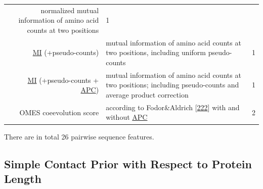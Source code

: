 \documentclass[11pt,a4paper,twoside]{book}
\theoremstyle{definition}
\theoremstyle{definition}
\theoremstyle{remark}
\begin{document}
\begin{longtable}[]{@{}rlc@{}}
\begin{minipage}[t]{0.50\columnwidth}
normalized mutual information of amino acid counts at two
positions\strut
\end{minipage} & \begin{minipage}[t]{0.18\columnwidth}\centering\strut
1\strut
\end{minipage}\tabularnewline
\begin{minipage}[t]{0.23\columnwidth}\raggedleft\strut
\protect\hyperlink{abbrev}{MI} (+pseudo-counts)\strut
\end{minipage} & \begin{minipage}[t]{0.50\columnwidth}\raggedright\strut
mutual information of amino acid counts at two positions, including
uniform pseudo-counts\strut
\end{minipage} & \begin{minipage}[t]{0.18\columnwidth}\centering\strut
1\strut
\end{minipage}\tabularnewline
\begin{minipage}[t]{0.23\columnwidth}\raggedleft\strut
\protect\hyperlink{abbrev}{MI} (+pseudo-counts +
\protect\hyperlink{abbrev}{APC})\strut
\end{minipage} & \begin{minipage}[t]{0.50\columnwidth}\raggedright\strut
mutual information of amino acid counts at two positions; including
pseudo-counts and average product correction\strut
\end{minipage} & \begin{minipage}[t]{0.18\columnwidth}\centering\strut
1\strut
\end{minipage}\tabularnewline
\begin{minipage}[t]{0.23\columnwidth}\raggedleft\strut
OMES coeevolution score\strut
\end{minipage} & \begin{minipage}[t]{0.50\columnwidth}\raggedright\strut
according to Fodor\&Aldrich
{[}\protect\hyperlink{ref-Fodor2004a}{222}{]} with and without
\protect\hyperlink{abbrev}{APC}\strut
\end{minipage} & \begin{minipage}[t]{0.18\columnwidth}\centering\strut
2\strut
\end{minipage}\tabularnewline
\bottomrule
\end{longtable}

There are in total 26 pairwise sequence features.

\subsection{Simple Contact Prior with Respect to Protein
Length}\label{simple-contact-prior-with-respect-to-protein-length}
\end{document}
